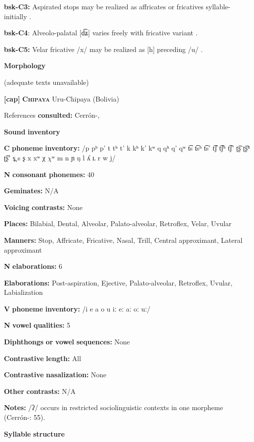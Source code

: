 \textbf{bsk-C3:} Aspirated stops may be realized as affricates or fricatives syllable-initially \citep[1025]{Anderson1997}.

\textbf{bsk-C4}: Alveolo-palatal [d͡ʑ] varies freely with fricative variant \citep[1025]{Anderson1997}.

\textbf{bsk-C5:} Velar fricative /x/ may be realized as [h] preceding /u/ \citep[1025]{Anderson1997}.

\textbf{Morphology}

(adequate texts unavailable)

\textbf{[cap]}   \textbf{\textsc{Chipaya}}  Uru-Chipaya (Bolivia)

References \textbf{consulted:} Cerrón-\citet{Palomino2006}, \citet{Olson1967}

\textbf{Sound} \textbf{inventory}

\textbf{C} \textbf{phoneme} \textbf{inventory:} /p pʰ p’ t tʰ t’ k kʰ k’ kʷ q qʰ q’ qʷ t͡s t͡sʰ t͡s’ t͡ʃ t͡ʃʰ t͡ʃ’ ʈ͡ʂ ʈ͡ʂʰ ʈ͡ʂ’ s̪ s ʂ x xʷ χ $\chi ʷ$ m n ɲ ŋ l ʎ ʟ r w j/

\textbf{N} \textbf{consonant} \textbf{phonemes:} 40

\textbf{Geminates:} N/A

\textbf{Voicing} \textbf{contrasts:} None

\textbf{Places:} Bilabial, Dental, Alveolar, Palato-alveolar, Retroflex, Velar, Uvular

\textbf{Manners:} Stop, Affricate, Fricative, Nasal, Trill, Central approximant, Lateral approximant

\textbf{N} \textbf{elaborations:} 6

\textbf{Elaborations:} Post-aspiration, Ejective, Palato-alveolar, Retroflex, Uvular, Labialization

\textbf{V} \textbf{phoneme} \textbf{inventory:} /i e a o u iː eː aː oː uː/

\textbf{N} \textbf{vowel} \textbf{qualities:} 5

\textbf{Diphthongs} \textbf{or} \textbf{vowel} \textbf{sequences:} None

\textbf{Contrastive} \textbf{length:} All

\textbf{Contrastive} \textbf{nasalization:} None

\textbf{Other} \textbf{contrasts:} N/A

\textbf{Notes:} /ʔ/ occurs in restricted sociolinguistic contexts in one morpheme (Cerrón-\citealt{Palomino2006}: 55).

\textbf{Syllable} \textbf{structure}

